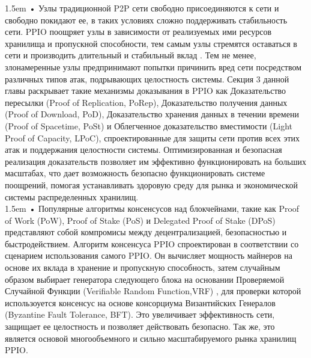 \documentclass[10pt,a4paper]{article}
\begin{document}
\hangindent 1.5em
\noindent   
• Узлы традиционной P2P сети свободно присоединяются к сети и свободно покидают ее, в таких условиях сложно поддерживать стабильность сети. PPIO поощряет узлы в зависимости от реализуемых ими ресурсов хранилища и пропускной способности, тем самым узлы стремятся оставаться в сети и производить длительный и стабильный вклад \cite{article1}. Тем не менее, злонамеренные узлы предпринимают попытки причинить вред сети посредством различных типов атак, подрывающих целостность системы. Секция 3 данной главы раскрывает такие механизмы доказывания в PPIO как Доказательство пересылки (Proof of Replication, PoRep), Доказательство получения данных (Proof of Download, PoD), Доказательство хранения данных в течении времени (Proof of Spacetime, PoSt) и Облегченное доказательство вместимости (Light Proof of Capacity, LPoC), спроектированные для защиты сети против всех этих атак и поддержания целостности системы. Оптимизированная и безопасная реализация доказательств позволяет им эффективно функционировать на больших масштабах, что дает возможность безопасно функционировать системе поощрений, помогая устанавливать здоровую среду для рынка и экономической системы распределенных хранилищ.
\vspace{-0.6em}
\\ 

\hangindent 1.5em
\noindent   
• Популярные алгоритмы консенсусов над блокчейнами, такие как Proof of Work (PoW), Proof of Stake (PoS) и Delegated Proof of Stake (DPoS) представляют собой компромисы между децентрализацией, безопасностью и быстродействием. Алгоритм консенсуса PPIO спроектирован в соответствии со сценарием использования самого PPIO. Он вычисляет мощность майнеров на основе их вклада в хранение и пропускную способность, затем случайным образом выбирает генератора следующего блока на основании Проверяемой Случайной Функции (Verifiable Random Function,VRF) \cite{article24} \cite{article25}, для проверки которой использоуется консенсус на основе консорциума Византийских Генералов (Byzantine Fault Tolerance, BFT). Это увеличивает эффективность сети, защищает ее целостность и позволяет действовать безопасно. Так же, это является основой многообъемного и сильно масштабируемого рынка хранилищ PPIO.
\vspace{-0.5em}
\end{document}
